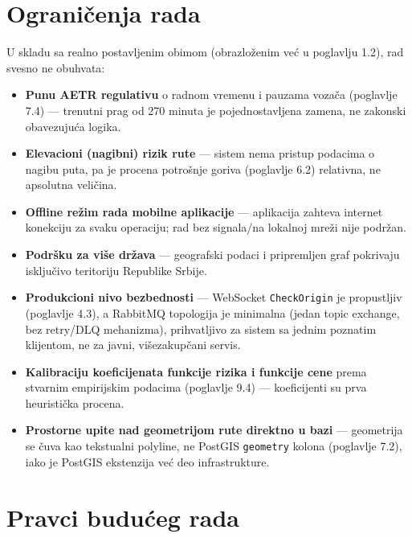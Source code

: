 \section{Ograničenja rada}

U skladu sa realno postavljenim obimom (obrazloženim već u poglavlju 1.2), rad svesno ne obuhvata:

\begin{itemize}
\item \textbf{Punu AETR regulativu} o radnom vremenu i pauzama vozača (poglavlje 7.4) — trenutni prag od 270 minuta je pojednostavljena zamena, ne zakonski obavezujuća logika.
\item \textbf{Elevacioni (nagibni) rizik rute} — sistem nema pristup podacima o nagibu puta, pa je procena potrošnje goriva (poglavlje 6.2) relativna, ne apsolutna veličina.
\item \textbf{Offline režim rada mobilne aplikacije} — aplikacija zahteva internet konekciju za svaku operaciju; rad bez signala/na lokalnoj mreži nije podržan.
\item \textbf{Podršku za više država} — geografski podaci i pripremljen graf pokrivaju isključivo teritoriju Republike Srbije.
\item \textbf{Produkcioni nivo bezbednosti} — WebSocket \texttt{CheckOrigin} je propustljiv (poglavlje 4.3), a RabbitMQ topologija je minimalna (jedan topic exchange, bez retry/DLQ mehanizma), prihvatljivo za sistem sa jednim poznatim klijentom, ne za javni, višezakupčani servis.
\item \textbf{Kalibraciju koeficijenata funkcije rizika i funkcije cene} prema stvarnim empirijskim podacima (poglavlje 9.4) — koeficijenti su prva heuristička procena.
\item \textbf{Prostorne upite nad geometrijom rute direktno u bazi} — geometrija se čuva kao tekstualni polyline, ne PostGIS \texttt{geometry} kolona (poglavlje 7.2), iako je PostGIS ekstenzija već deo infrastrukture.
\end{itemize}

\section{Pravci budućeg rada}

